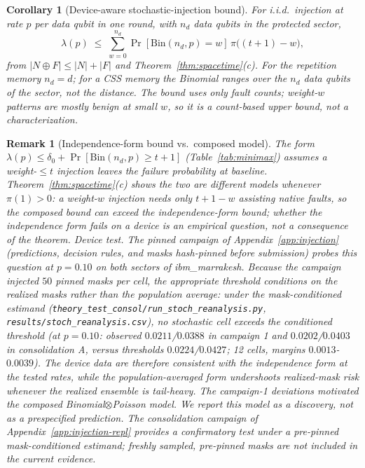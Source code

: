 \documentclass[pdflatex,sn-mathphys-num]{sn-jnl}
\theoremstyle{thmstyleone}
\newtheorem{corollary}[theorem]{Corollary}
\theoremstyle{thmstyletwo}
\newtheorem{remark}{Remark}
\theoremstyle{thmstylethree}
\begin{document}
\begin{corollary}[Device-aware stochastic-injection bound]\label{cor:stoch}
For i.i.d.\ injection at rate $p$ per data qubit in one round, with $n_d$ data qubits in the protected sector,
\[
\lambda(p)\;\le\;\sum_{w=0}^{n_d}\Pr[\mathrm{Bin}(n_d,p)=w]\,
\pi\bigl((t{+}1)-w\bigr),
\]
from $|N\oplus F|\le|N|+|F|$ and Theorem~\ref{thm:spacetime}(c). For the repetition memory $n_d=d$; for a CSS memory the Binomial ranges over the $n_d$ data qubits of the sector, not the distance. The bound uses only fault counts; weight-$w$ patterns are mostly benign at small $w$, so it is a count-based upper bound, not a characterization.
\end{corollary}

\begin{remark}[Independence-form bound vs.\ composed model]\label{rem:naive-false}
The form $\lambda(p)\le\delta_0+\Pr[\mathrm{Bin}(n_d,p)\ge t{+}1]$ (Table~\ref{tab:minimax}) assumes a weight-$\le t$ injection leaves the failure probability at baseline. Theorem~\ref{thm:spacetime}(c) shows the two are \emph{different models} whenever $\pi(1)>0$: a weight-$w$ injection needs only $t{+}1{-}w$ assisting native faults, so the composed bound can exceed the independence-form bound; whether the independence form fails on a device is an empirical question, not a consequence of the theorem. \emph{Device test.} The pinned campaign of Appendix~\ref{app:injection} (predictions, decision rules, and masks hash-pinned before submission) probes this question at $p=0.10$ on both sectors of ibm\_marrakesh. Because the campaign injected $50$ \emph{pinned} masks per cell, the appropriate threshold conditions on the realized masks rather than the population average: under the mask-conditioned estimand (\texttt{theory\_test\_consol/run\_stoch\_reanalysis.py}, \texttt{results/stoch\_reanalysis.csv}), no stochastic cell exceeds the conditioned threshold (at $p=0.10$: observed $0.0211$/$0.0388$ in campaign 1 and $0.0202$/$0.0403$ in consolidation A, versus thresholds $0.0224$/$0.0427$; 12 cells, margins $0.0013$-$0.0039$). The device data are therefore consistent with the independence form at the tested rates, while the population-averaged form undershoots realized-mask risk whenever the realized ensemble is tail-heavy. The campaign-1 deviations \emph{motivated} the composed Binomial$\otimes$Poisson model. We report this model as a discovery, not as a prespecified prediction. The consolidation campaign of Appendix~\ref{app:injection-repl} provides a confirmatory test under a pre-pinned mask-conditioned estimand; freshly sampled, pre-pinned masks are not included in the current evidence.
\end{remark}
\end{document}
